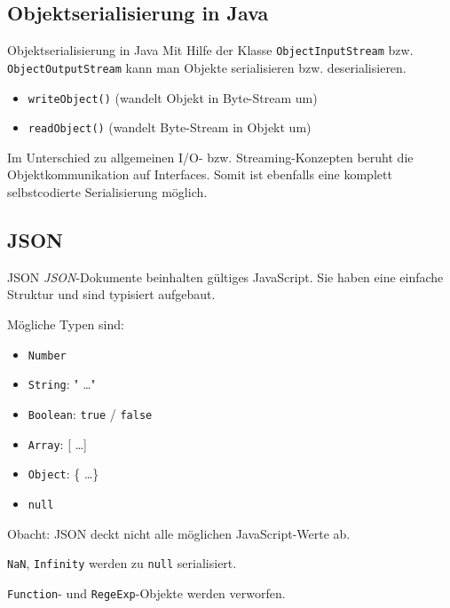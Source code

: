 \subsection{Objektserialisierung in Java}

\begin{bonus}{Objektserialisierung in Java}
    Mit Hilfe der Klasse \texttt{ObjectInputStream} bzw. \texttt{ObjectOutputStream} kann man Objekte serialisieren bzw. deserialisieren.
    
    \begin{itemize}
        \item \texttt{writeObject()} (wandelt Objekt in Byte-Stream um)
        \item \texttt{readObject()} (wandelt Byte-Stream in Objekt um)
    \end{itemize}
    
    Im Unterschied zu allgemeinen I/O- bzw. Streaming-Konzepten beruht die Objektkommunikation auf Interfaces.
    Somit ist ebenfalls eine komplett selbstcodierte Serialisierung möglich.
\end{bonus}

\subsection{JSON}

\begin{defi}{JSON}
    \emph{JSON}-Dokumente beinhalten gültiges JavaScript.
    Sie haben eine einfache Struktur und sind typisiert aufgebaut.
    
    Mögliche Typen sind:
    \begin{itemize}
        \item \texttt{Number}
        \item \texttt{String}: " \ldots "
        \item \texttt{Boolean}: \texttt{true} / \texttt{false}
        \item \texttt{Array}: [ \ldots ]
        \item \texttt{Object}: \{ \ldots \}
        \item \texttt{null}
    \end{itemize}
    
    Obacht: JSON deckt nicht alle möglichen JavaScript-Werte ab.
    
    \texttt{NaN}, \texttt{Infinity} werden zu \texttt{null} serialisiert.
    
    \texttt{Function}- und \texttt{RegeExp}-Objekte werden verworfen.
\end{defi}

